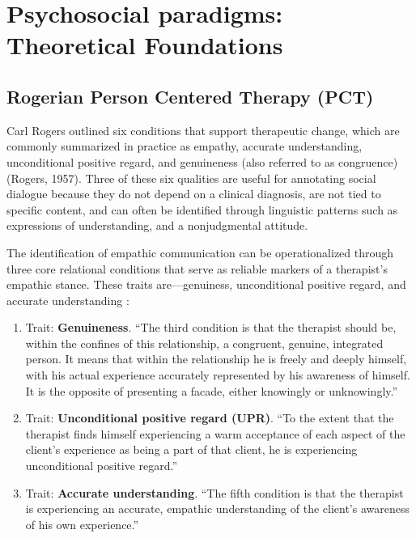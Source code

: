 



\section{Psychosocial paradigms: Theoretical Foundations}

\subsection{Rogerian Person Centered Therapy (PCT)}

Carl Rogers outlined six conditions that support therapeutic change, which are commonly summarized in practice as empathy, accurate understanding, unconditional positive regard, and genuineness (also referred to as congruence) (Rogers, 1957). Three of these six qualities are useful for annotating social dialogue because they do not depend on a clinical diagnosis, are not tied to specific content, and can often be identified through linguistic patterns such as expressions of understanding, and a nonjudgmental attitude.

The identification of empathic communication can be operationalized through three core relational conditions that serve as reliable markers of a therapist’s empathic stance. These traits are—genuiness, unconditional positive regard, and accurate understanding \cite{conditions-rogers}:

\begin{enumerate}
    \item Trait: \textbf{Genuineness}. “The third condition is that the therapist should be, within the confines of this relationship, a congruent, genuine, integrated person. It means that within the relationship he is freely and deeply himself, with his actual experience accurately represented by his awareness of himself. It is the opposite of presenting a facade, either knowingly or unknowingly.”
    \item Trait: \textbf{Unconditional positive regard (UPR)}. “To the extent that the therapist finds himself experiencing a warm acceptance of each aspect of the client's experience as being a part of that client, he is experiencing unconditional positive regard.”
    \item Trait: \textbf{Accurate understanding}. “The fifth condition is that the therapist is experiencing an accurate, empathic understanding of the client's awareness of his own experience.”
\end{enumerate}

